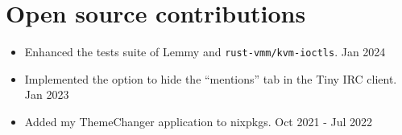 \documentclass[a4paper,12pt]{article}
\begin{document}


\section{Open source contributions}
\begin{itemize}[nosep,after=\strut, leftmargin=1em, itemsep=3pt]
    \item Enhanced the tests suite of Lemmy and \verb|rust-vmm/kvm-ioctls|. \hfill \faCalendar* Jan 2024
    \item Implemented the option to hide the ``mentions'' tab in the Tiny IRC client. \hfill \faCalendar* Jan 2023
    \item Added my ThemeChanger application to nixpkgs. \hfill \faCalendar* Oct 2021 - Jul 2022
\end{itemize}
\end{document}
